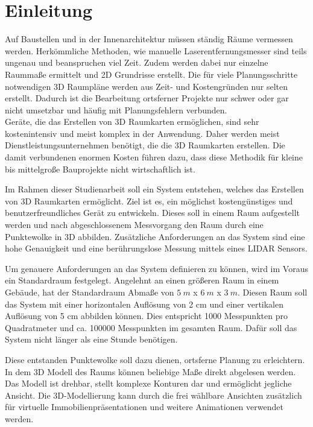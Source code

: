\chapter{Einleitung}\label{chap:einleitung}


Auf Baustellen und in der Innenarchitektur müssen ständig Räume vermessen werden. Herkömmliche Methoden, wie manuelle Laserentfernungsmesser sind teils ungenau und beanspruchen viel Zeit. Zudem werden dabei nur einzelne Raummaße ermittelt und 2D Grundrisse erstellt. Die für viele Planungsschritte notwendigen 3D Raumpläne werden aus Zeit- und Kostengründen nur selten erstellt. Dadurch ist die Bearbeitung ortsferner Projekte nur schwer oder gar nicht umsetzbar und häufig mit Planungsfehlern verbunden. \\
Geräte, die das Erstellen von 3D Raumkarten ermöglichen, sind sehr kostenintensiv und meist komplex in der Anwendung. Daher werden meist Dienstleistungsunternehmen benötigt, die die 3D Raumkarten erstellen. Die damit verbundenen enormen Kosten führen dazu, dass diese Methodik für kleine bis mittelgroße Bauprojekte nicht wirtschaftlich ist.

Im Rahmen dieser Studienarbeit soll ein System entstehen, welches das Erstellen von 3D Raumkarten ermöglicht. Ziel ist es, ein möglichst kostengünstiges und benutzerfreundliches Gerät zu entwickeln. Dieses soll in einem Raum aufgestellt werden und nach abgeschlossenem Messvorgang den Raum durch eine Punktewolke in 3D abbilden. Zusätzliche Anforderungen an das System sind eine hohe Genauigkeit und eine berührungslose Messung mittels eines \ac{LIDAR} Sensors.

Um genauere Anforderungen an das System definieren zu können, wird im Voraus ein Standardraum festgelegt. Angelehnt an einen größeren Raum in einem Gebäude, hat der Standardraum Abmaße von $5\:m$ x $6\:m$ x $3\:m$. Diesen Raum soll das System mit einer horizontalen Auflösung von 2 cm und einer vertikalen Auflösung von 5 cm abbilden können. Dies entspricht 1000 Messpunkten pro Quadratmeter und ca. 100000 Messpunkten im gesamten Raum. Dafür soll das System nicht länger als eine Stunde benötigen. 

Diese entstanden Punktewolke soll dazu dienen, ortsferne Planung zu erleichtern. In dem 3D Modell des Raums können beliebige Maße direkt abgelesen werden. Das Modell ist drehbar, stellt komplexe Konturen dar und ermöglicht jegliche Ansicht.
Die 3D-Modellierung kann durch die frei wählbare Ansichten zusätzlich für virtuelle Immobilienpräsentationen und weitere Animationen verwendet werden.      


